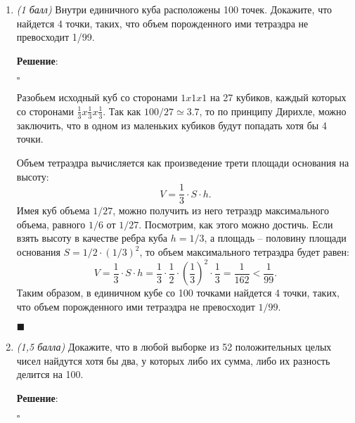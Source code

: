 \documentclass{article}
\begin{document}
\begin{enumerate}
        \item \textit{(1 балл)} Внутри единичного куба расположены 100 точек. Докажите, что найдется
        4 точки, таких, что объем порожденного ими тетраэдра не превосходит 1/99.

        \textbf{Решение}:

        $\square$

        Разобьем исходный куб со сторонами $1 x 1 x 1$ на 27 кубиков, каждый которых со сторонами $\frac{1}{3} x \frac{1}{3} x \frac{1}{3}$. Так как $100 / 27 \simeq 3.7$, то по принципу Дирихле, можно заключить, что в одном из маленьких кубиков будут попадать хотя бы 4 точки.

        Объем тетраэдра вычисляется как произведение трети площади основания на высоту:
        \begin{equation}
            V = \frac{1}{3}\cdot S\cdot h.
        \end{equation}
        Имея куб объема $1/27$, можно получить из него тетраэдр максимального объема, равного $1/6$ от $1/27$. Посмотрим, как этого можно достичь. Если взять высоту в качестве ребра куба $h=1/3$, а площадь -- половину площади основания $S=1/2\cdot(1/3)^2$, то объем максимального тетраэдра будет равен:
        \begin{equation}
            V = \frac{1}{3}\cdot S\cdot h = \frac{1}{3}\cdot \frac{1}{2}\cdot\left(\frac{1}{3}\right)^2\cdot \frac{1}{3} = \frac{1}{162} < \frac{1}{99}.
        \end{equation}
        Таким образом, в единичном кубе со 100 точками найдется 4 точки, таких, что объем порожденного ими тетраэдра не превосходит $1/99$.

        \begin{flushright}
            $\blacksquare$
        \end{flushright}

        \item \textit{(1,5 балла)} Докажите, что в любой выборке из 52 положительных целых чисел найдутся хотя бы два, у которых либо их сумма, либо их разность делится на 100.
        
        \textbf{Решение}:

        $\square$


\end{enumerate}
\end{document}
